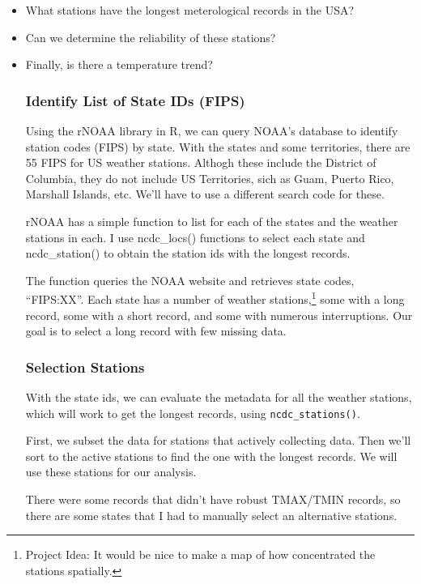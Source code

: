 \documentclass{article}
\begin{document}
\begin{itemize}
  \item What stations have the longest meterological records in the USA?
  \item Can we determine the reliability of these stations?
  \item Finally, is there a temperature trend?

\subsubsection{Identify List of State IDs (FIPS)}

Using the rNOAA library in R, we can query NOAA's database to identify station codes (FIPS) by state. With the states and some territories, there are 55 FIPS for US weather stations. Althogh these include the District of Columbia, they do not include US Territories, sich as Guam, Puerto Rico, Marshall Islands, etc. We'll have to use a different search code for these.

rNOAA has a simple function to list for each of the states and the weather stations in each. I use ncdc\_locs() functions to select each state and ncdc\_station() to obtain the station ids with the longest records. 



The function queries the NOAA website and retrieves state codes, ``FIPS:XX''. Each state has a number of weather stations,\footnote{Project Idea: It would be nice to make a map of how concentrated the stations spatially.} some with a long record, some with a short record, and some with numerous interruptions. Our goal is to select a long record with few missing data. 

\subsubsection{Selection Stations}

With the state ids, we can evaluate the metadata for all the weather stations, which will work to get the longest records, using \texttt{ncdc\_stations()}. 

First, we subset the data for stations that actively collecting data. Then we'll sort to the active stations to find the one with the longest records. We will use these stations for our analysis. 

There were some records that didn't have robust TMAX/TMIN records, so there are some states that I had to manually select an alternative stations. 


\end{itemize}
\end{document}
